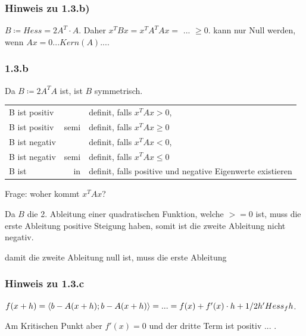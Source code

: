 \subsubsection*{Hinweis zu 1.3.b)}
$B \coloneqq Hess = 2A^T\cdot A $. Daher $x^TBx = x^TA^TAx = $ ... $\geq 0$. 
kann nur Null werden, wenn $Ax = 0 ... Kern(A) ...$.

\subsubsection*{1.3.b}
Da $B \coloneqq 2 A^TA$ ist, ist $B$ symmetrisch.

\setlength\tabcolsep{1pt} %
\begin{table}[ht]
\begin{tabular}{lrl}
	B ist positiv &&definit, falls $x^TAx > 0$,\\
	B ist positiv & semi&definit, falls $x^TAx \geq 0$\\
	B ist negativ &&definit, falls $x^TAx < 0$,\\
	B ist negativ & semi&definit, falls $x^TAx \leq 0$\\
	B ist &in&definit, falls positive und negative Eigenwerte existieren
\end{tabular}
\end{table}

Frage: woher kommt $x^T A x$?

Da $B$ die 2. Ableitung einer quadratischen Funktion, welche $>= 0$ ist, muss die erste Ableitung positive Steigung haben, somit ist die zweite Ableitung nicht negativ.

damit die zweite Ableitung null ist, muss die erste Ableitung 



\subsubsection*{Hinweis zu 1.3.c}
$f(x+h) = \left\langle b-A(x+h);b-A(x+h)\right\rangle = ... = f(x) + f'(x) \cdot h + 1/2 h' Hess_f h$.

Am Kritischen Punkt aber $f'(x) = 0$ und der dritte Term ist positiv ... .

